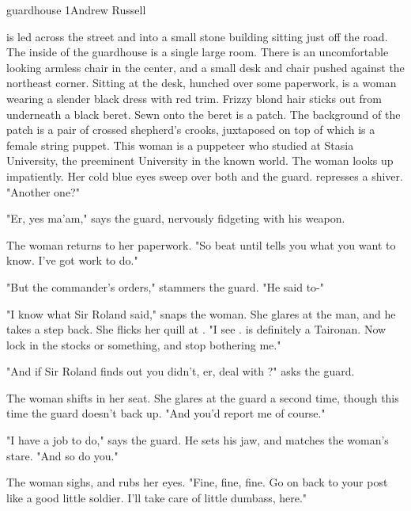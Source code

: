 \documentclass{book}
\begin{document}
\begin{childnode}{guardhouse 1}{Andrew Russell}


    \name{} is led across the street and into a small stone building sitting just off the road. The 
    inside of the guardhouse is a single large room. There is an uncomfortable looking armless 
    chair in the center, and a small desk and chair pushed against the northeast corner. Sitting at 
    the desk, hunched over some paperwork, is a woman wearing a slender black dress with red trim. 
    Frizzy blond hair sticks out from underneath a black beret. Sewn onto the beret is a patch. 
    The background of the patch is a pair of crossed shepherd's crooks, juxtaposed on top of which 
    is a female string puppet.
This woman is a puppeteer who studied at Stasia University, the preeminent University in the known 
world.
The woman looks up impatiently. Her cold blue eyes sweep over both \name{} 
and the guard. \name{} represses a shiver. "Another one?"

"Er, yes ma'am," says the guard, nervously fidgeting with his weapon.

The woman returns to her paperwork. "So beat \himher{} until \heshe{} tells you what you want to 
know. I've got work to do."

"But the commander's orders," stammers the guard. "He said to-"

"I know what Sir Roland said," snaps the woman. She glares at the man, and he takes a step back. 
She flicks her quill at \name{}. "I see \himher{}. \HeShe{} is definitely a Taironan. Now lock
\himher{} in the stocks or something, and stop bothering me."

"And if Sir Roland finds out you didn't, er, deal with \himher{}?" asks the guard.

The woman shifts in her seat. She glares at the guard a second time, though this time the guard 
doesn't back up. "And you'd report me of course."

"I have a job to do," says the guard. He sets his jaw, and matches the woman's stare. "And so do 
you."

The woman sighs, and rubs her eyes. "Fine, fine, fine. Go on back to your post like a good little 
soldier. I'll take care of little \mistermiss{} dumbass, here."




\end{childnode}
\end{document}
